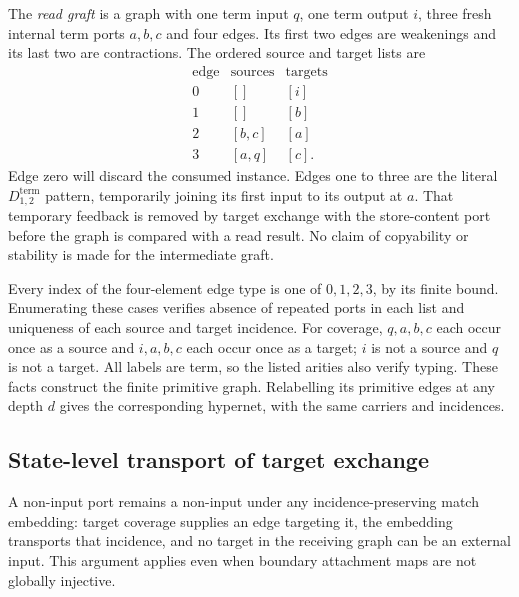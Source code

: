 The \emph{read graft} is a graph with one term input $q$, one term output $i$,
three fresh internal term ports $a,b,c$ and four edges. Its first two edges
are weakenings and its last two are contractions. The ordered source and
target lists are
\[
\begin{array}{c|c|c}
\text{edge}&\text{sources}&\text{targets}\\\hline
0&[]&[i]\\
1&[]&[b]\\
2&[b,c]&[a]\\
3&[a,q]&[c].
\end{array}
\]
Edge zero will discard the consumed instance. Edges one to three are the
literal $D^{\mathrm{term}}_{1,2}$ pattern, temporarily joining its first input
to its output at $a$. That temporary feedback is removed by target exchange
with the store-content port before the graph is compared with a read result.
No claim of copyability or stability is made for the intermediate graft.




Every index of the four-element edge type is one of $0,1,2,3$, by its
finite bound. Enumerating these cases verifies absence of repeated ports
in each list and uniqueness of each source and target incidence. For coverage,
$q,a,b,c$ each occur once as a source and $i,a,b,c$ each occur once as a
target; $i$ is not a source and $q$ is not a target. All labels are term,
so the listed arities also verify typing. These facts construct the finite
primitive graph. Relabelling its primitive edges at any depth $d$ gives
the corresponding hypernet, with the same carriers and incidences.




\subsection{State-level transport of target exchange}

A non-input port remains a non-input under any incidence-preserving match
embedding: target coverage supplies an edge targeting it, the embedding
transports that incidence, and no target in the receiving graph can be an
external input. This argument applies even when boundary attachment maps
are not globally injective.

